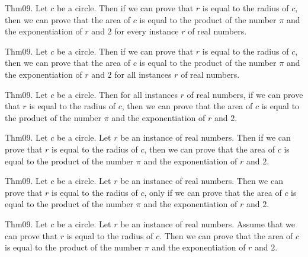 \documentclass{article}
\begin{document}
Thm09. Let $c$ be a circle. Then if we can prove that $r$ is equal to the radius of $c$, then we can prove that the area of $c$ is equal to the product of the number \(\pi\) and the exponentiation of $r$ and $2$ for every instance $r$ of real numbers.

Thm09. Let $c$ be a circle. Then if we can prove that $r$ is equal to the radius of $c$, then we can prove that the area of $c$ is equal to the product of the number \(\pi\) and the exponentiation of $r$ and $2$ for all instances $r$ of real numbers.

Thm09. Let $c$ be a circle. Then for all instances $r$ of real numbers, if we can prove that $r$ is equal to the radius of $c$, then we can prove that the area of $c$ is equal to the product of the number \(\pi\) and the exponentiation of $r$ and $2$.

Thm09. Let $c$ be a circle. Let $r$ be an instance of real numbers. Then if we can prove that $r$ is equal to the radius of $c$, then we can prove that the area of $c$ is equal to the product of the number \(\pi\) and the exponentiation of $r$ and $2$.

Thm09. Let $c$ be a circle. Let $r$ be an instance of real numbers. Then we can prove that $r$ is equal to the radius of $c$, only if we can prove that the area of $c$ is equal to the product of the number \(\pi\) and the exponentiation of $r$ and $2$.

Thm09. Let $c$ be a circle. Let $r$ be an instance of real numbers. Assume that we can prove that $r$ is equal to the radius of $c$. Then we can prove that the area of $c$ is equal to the product of the number \(\pi\) and the exponentiation of $r$ and $2$.
\end{document}
